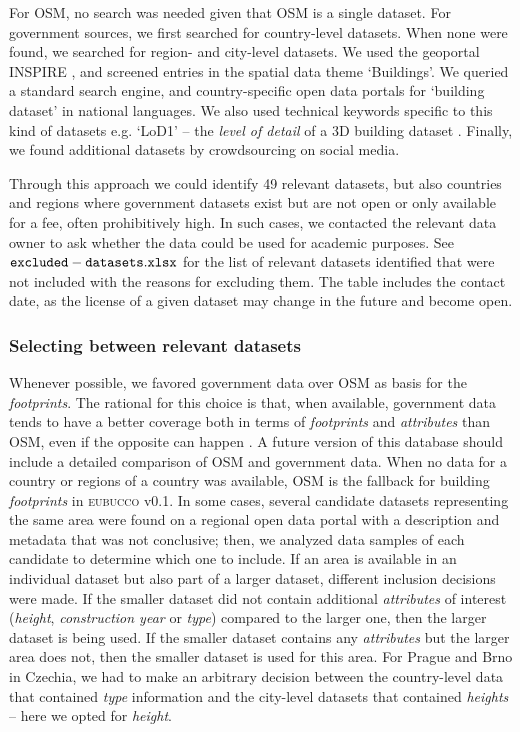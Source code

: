\documentclass[fleqn,10pt]{wlscirep}
\begin{document}
For OSM, no search was needed given that OSM is a single dataset. For government sources, we first searched for country-level datasets. When none were found, we searched for region- and city-level datasets.
We used the geoportal INSPIRE \cite{inspire2022}, and screened entries in the spatial data theme `Buildings'. 
We queried a standard search engine, and country-specific open data portals for `building dataset' in national languages. We also used technical keywords specific to this kind of datasets e.g. `LoD1' -- the \textit{level of detail} of a 3D building dataset \cite{biljecki2016improved}. Finally, we found additional datasets by crowdsourcing on social media.

Through this approach we could identify 49 relevant datasets, but also countries and regions where government datasets exist but are not open or only available for a fee, often prohibitively high. In such cases, we contacted the relevant data owner to ask whether the data could be used for academic purposes.  See ${\tt excluded-datasets.xlsx}$ for the list of relevant datasets identified that were not included with the reasons for excluding them. The table includes the contact date, as the license of a given dataset may change in the future and become open.


\subsubsection*{Selecting between relevant datasets}

Whenever possible, we favored government data over OSM as basis for the \textit{footprints}. The rational for this choice is that, when available, government data tends to have a better coverage both in terms of \textit{footprints} and \textit{attributes} than OSM, even if the opposite can happen \cite{Antoniou:2015hl,Minghini.2019}. A future version of this database should include a detailed comparison of OSM and government data. When no data for a country or regions of a country was available, OSM is the fallback for building \textit{footprints} in \textsc{eubucco} v0.1. In some cases, several candidate datasets representing the same area were found on a regional open data portal with a description and metadata that was not conclusive; then, we analyzed data samples of each candidate to determine which one to include.  If an area is available in an individual dataset but also part of a larger dataset, different inclusion decisions were made. If the smaller dataset did not contain additional \textit{attributes} of interest (\textit{height}, \textit{construction year} or \textit{type}) compared to the larger one, then the larger dataset is being used. If the smaller dataset contains any \textit{attributes} but the larger area does not, then the smaller dataset is used for this area. For Prague and Brno in Czechia, we had to make an arbitrary decision between the country-level data that contained \textit{type} information and the city-level datasets that contained \textit{heights} -- here we opted for \textit{height}.  
\end{document}
